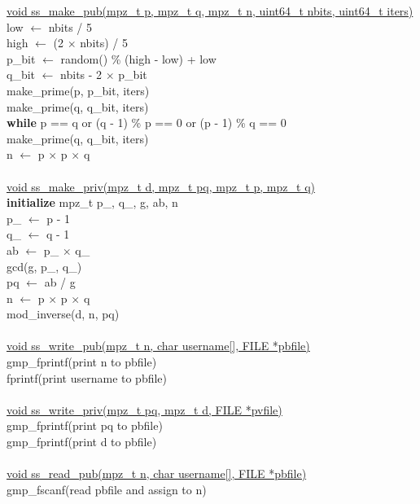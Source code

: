 \documentclass[12pt]{article}
\begin{document}
\underline{void ss\_make\_pub(mpz\_t p, mpz\_t q, mpz\_t n, uint64\_t nbits, uint64\_t iters)} \\
\indent low $\leftarrow$ nbits / 5 \\
\indent high $\leftarrow$ (2 $\times$ nbits) / 5 \\
\indent p\_bit $\leftarrow$ random() \% (high - low) + low \\
\indent q\_bit $\leftarrow$ nbits - 2 $\times$ p\_bit \\
\indent make\_prime(p, p\_bit, iters) \\
\indent make\_prime(q, q\_bit, iters) \\
\indent \textbf{while} p == q or (q - 1) \% p == 0 or (p - 1) \% q == 0 \\
\indent \indent make\_prime(q, q\_bit, iters) \\
\indent n $\leftarrow$ p $\times$ p $\times$ q \\
\\
\underline{void ss\_make\_priv(mpz\_t d, mpz\_t pq, mpz\_t p, mpz\_t q)} \\
\indent \textbf{initialize} mpz\_t p\_, q\_, g, ab, n \\
\indent p\_ $\leftarrow$ p - 1 \\
\indent q\_ $\leftarrow$ q - 1 \\
\indent ab $\leftarrow$ p\_ $\times$ q\_ \\
\indent gcd(g, p\_, q\_) \\
\indent pq $\leftarrow$ ab / g \\
\indent n $\leftarrow$ p $\times$ p $\times$ q \\
\indent mod\_inverse(d, n, pq) \\
\\
\underline{void ss\_write\_pub(mpz\_t n, char username[], FILE *pbfile)} \\
\indent gmp\_fprintf(print n to pbfile) \\
\indent fprintf(print username to pbfile) \\
\\
\underline{void ss\_write\_priv(mpz\_t pq, mpz\_t d, FILE *pvfile)} \\
\indent gmp\_fprintf(print pq to pbfile) \\
\indent gmp\_fprintf(print d to pbfile) \\
\\
\underline{void ss\_read\_pub(mpz\_t n, char username[], FILE *pbfile)} \\
\indent gmp\_fscanf(read pbfile and assign to n) \\
\end{document}

